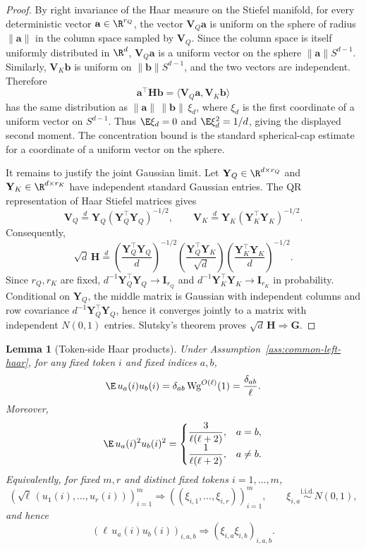 \documentclass{article}
\newcommand{\weak}{\Rightarrow}
\newcommand{\bV}{\mathbf{V}}
\newcommand{\bG}{\mathbf{G}}
\newcommand{\bH}{\mathbf{H}}
\newtheorem{lemma}[theorem]{Lemma}
\theoremstyle{definition}
\theoremstyle{remark}
\begin{document}
\begin{proof}
By right invariance of the Haar measure on the Stiefel manifold, for every
deterministic vector $\mathbf a\in\R^{r_Q}$, the vector $\bV_Q\mathbf a$ is
uniform on the sphere of radius $\|\mathbf a\|$ in the column space sampled by
$\bV_Q$.  Since the column space is itself uniformly distributed in $\R^d$,
$\bV_Q\mathbf a$ is a uniform vector on the sphere
$\|\mathbf a\|S^{d-1}$.  Similarly, $\bV_K\mathbf b$ is uniform on
$\|\mathbf b\|S^{d-1}$, and the two vectors are independent.  Therefore
\[
    \mathbf a^\top\bH\mathbf b
    =
    \langle \bV_Q\mathbf a,\bV_K\mathbf b\rangle
\]
has the same distribution as
$\|\mathbf a\|\,\|\mathbf b\|\,\xi_d$, where $\xi_d$ is the first coordinate of
a uniform vector on $S^{d-1}$.  Thus $\E\xi_d=0$ and $\E\xi_d^2=1/d$, giving the
displayed second moment.  The concentration bound is the standard spherical-cap
estimate for a coordinate of a uniform vector on the sphere.

It remains to justify the joint Gaussian limit.  Let
$\mathbf Y_Q\in\R^{d\times r_Q}$ and $\mathbf Y_K\in\R^{d\times r_K}$ have independent
standard Gaussian entries.  The QR representation of Haar Stiefel matrices gives
\[
    \bV_Q
    \stackrel{d}{=}
    \mathbf Y_Q(\mathbf Y_Q^\top\mathbf Y_Q)^{-1/2},
    \qquad
    \bV_K
    \stackrel{d}{=}
    \mathbf Y_K(\mathbf Y_K^\top\mathbf Y_K)^{-1/2}.
\]
Consequently,
\[
    \sqrt d\,\bH
    \stackrel{d}{=}
    \left(\frac{\mathbf Y_Q^\top\mathbf Y_Q}{d}\right)^{-1/2}
    \left(\frac{\mathbf Y_Q^\top\mathbf Y_K}{\sqrt d}\right)
    \left(\frac{\mathbf Y_K^\top\mathbf Y_K}{d}\right)^{-1/2}.
\]
Since $r_Q,r_K$ are fixed,
$d^{-1}\mathbf Y_Q^\top\mathbf Y_Q\to\mathbf I_{r_Q}$ and
$d^{-1}\mathbf Y_K^\top\mathbf Y_K\to\mathbf I_{r_K}$ in probability.  Conditional on
$\mathbf Y_Q$, the middle matrix is Gaussian with independent columns and row
covariance $d^{-1}\mathbf Y_Q^\top\mathbf Y_Q$, hence it converges jointly to a matrix with
independent $N(0,1)$ entries.  Slutsky's theorem proves
$\sqrt d\,\bH\weak\bG$.
\end{proof}

\begin{lemma}[Token-side Haar products]
Under Assumption~\ref{ass:common-left-haar}, for any fixed token $i$ and fixed
indices $a,b$,
\[
    \E\,u_a(i)u_b(i)=\delta_{ab}\,\mathrm{Wg}^{O(\ell)}(1)
    =
    \frac{\delta_{ab}}{\ell}.
\]
Moreover,
\[
    \E\,u_a(i)^2u_b(i)^2
    =
    \begin{cases}
    \displaystyle \frac{3}{\ell(\ell+2)}, & a=b,\\[1ex]
    \displaystyle \frac{1}{\ell(\ell+2)}, & a\neq b.
    \end{cases}
\]
Equivalently, for fixed $m,r$ and distinct fixed tokens $i=1,\ldots,m$,
\[
    \left(\sqrt{\ell}\,(u_1(i),\ldots,u_r(i))\right)_{i=1}^m
    \weak
    \left((\xi_{i,1},\ldots,\xi_{i,r})\right)_{i=1}^m,
    \qquad
    \xi_{i,a}\stackrel{\mathrm{i.i.d.}}{\sim}N(0,1),
\]
and hence
\[
    \left(\ell\,u_a(i)u_b(i)\right)_{i,a,b}
    \weak
    \left(\xi_{i,a}\xi_{i,b}\right)_{i,a,b}.
\]
\label{lem:token-haar-products}
\end{lemma}
\end{document}
